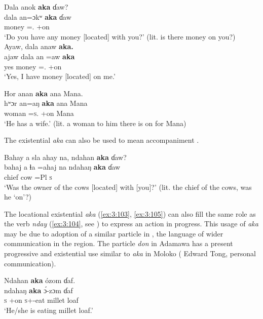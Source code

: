 \ea \label{ex:3:100}
\ea Dala  anok \textbf{aka}  ɗaw? \\
\gll  dala   an=ɔkʷ     \textbf{aka}     ɗaw  \\
      money  {\DAT}={\twoS}.{\IO}  {\EXT}+on    {\QUEST}  \\
\glt  ‘Do you have any money [located] with you?’ (lit. is there money on you?)\\

\medskip
\ex
   Ayaw,  dala  anaw  \textbf{aka.}\\
\gll ajaw  dala   an  =aw   \textbf{aka}\\
   yes  money  {\DAT} ={\oneS}.{\IO}  {\EXT}+on\\
\glt ‘Yes, I have money [located] on me.’ 
\z\z

\ea \label{ex:3:101}
Hor  anan  \textbf{aka} ana  Mana.\\
\gll  hʷɔr   an=aŋ     \textbf{aka} ana   Mana\\
      woman  {\DAT}=\textsc{s}.{\IO}  {\EXT}+on    {\DAT} Mana\\
\glt  ‘He has a wife.’ (lit. a woman to him there is on for Mana)
\z

The existential \textit{aka} can also be used to mean accompaniment .

\ea \label{ex:3:102}
 Bahay  a  sla  ahay  na,  ndahan  \textbf{aka}  ɗaw?\\
\gll  bahaj  a  ɬa  =ahaj  na  ndahaŋ  \textbf{aka}  ɗaw\\
      chief  {\GEN}  cow  =Pl  {\PSP}  \textsc{s}  {\EXT}  {\QUEST}\\
\glt  ‘Was the owner of the cows [located] with [you]?' (lit. the chief of the cows, was he ‘on’?)
\z

The locational existential \textit{aka}  (\ref{ex:3:103}, \ref{ex:3:105}) can also fill the same role as the verb \textit{nday} (\ref{ex:3:104}, see ) to express an action in progress. This usage of \textit{aka} may be due to adoption of a similar particle in , the language of wider communication in the region. The particle \textit{don} in Adamawa  has a present progressive and existential use similar to \textit{aka} in Moloko (%
Edward Tong, personal communication).

\ea \label{ex:3:103}
Ndahan \textbf{aka} ózom ɗaf.\\
\gll  ndahaŋ   \textbf{aka}     \'{ɔ}-zɔm     ɗaf\\
      \textsc{s}    {\EXT}+on    \textsc{s}+{\IFV}-eat  {millet loaf}\\
\glt  ‘He/she is eating millet loaf.’
\z

